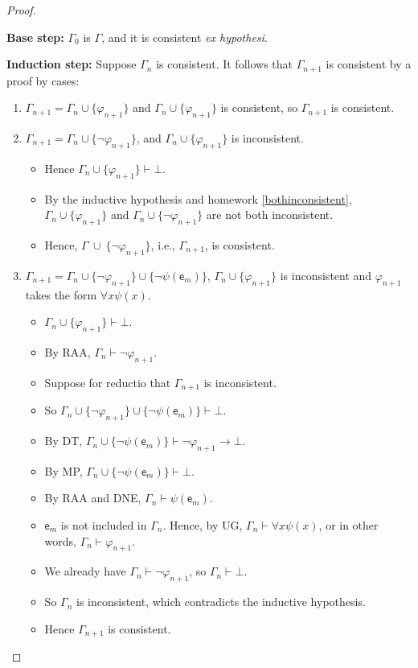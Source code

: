 \documentclass[12pt]{report}
\theoremstyle{nonumberplain}
\newtheorem{proof}{Proof}
\renewcommand{\o}[1]{\mathsf{#1}}
\begin{document}
\begin{proof}
\begin{enumerate}
\textbf{Base step:} $Γ_0$ is $Γ$, and it is consistent \textit{ex hypothesi}.

\textbf{Induction step:} Suppose $Γ_n$ is consistent. It follows that $Γ_{n+1}$ is consistent by a proof by cases:
\begin{enumerate}[label={Case~(\roman*):}]

\item $Γ_{n+1} = Γ_n ∪ \{φ_{n+1}\}$ and $Γ_n ∪ \{φ_{n+1}\}$ is consistent, so $Γ_{n+1}$ is consistent.

\item $Γ_{n+1} = Γ_n ∪ \{¬φ_{n+1}\}$, and $Γ_n ∪ \{φ_{n+1}\}$ is inconsistent.
\begin{itemize}[nolistsep,leftmargin=*]
\item Hence $Γ_n ∪ \{φ_{n+1}\} ⊢  ⊥$.

\item By the inductive hypothesis and homework \ref{bothinconsistent}, $Γ_n ∪ \{φ_{n+1}\}$ and $Γ_n ∪ \{¬φ_{n+1}\}$ are not both inconsistent.

\item Hence, $Γ\ ∪\ \{¬φ_{n+1}\}$, i.e., $Γ_{n+1}$, is consistent.

\end{itemize}

\item $Γ_{n+1} = Γ_n ∪ \{¬φ_{n+1}\} ∪ \{¬ψ (\o{e}_m)\}$,
$Γ_n ∪ \{φ_{n+1}\}$ is inconsistent and $φ_{n+1}$ takes the form $∀x ψ(x)$.
\begin{itemize}[nolistsep,leftmargin=*]
\item $Γ_n ∪ \{φ_{n+1}\} ⊢  ⊥$.
\item By RAA, $Γ_n ⊢  ¬φ_{n+1}$.
\item Suppose for reductio that $Γ_{n+1}$ is inconsistent.
\item So
 $Γ_n ∪ \{¬φ_{n+1}\} ∪ \{¬ψ(\o{e}_m)\} ⊢  ⊥$.
\item By DT, $Γ_n ∪ \{¬ψ(\o{e}_m)\} ⊢ ¬φ_{n+1} → ⊥$.
\item By MP, $Γ_n ∪ \{¬ψ(\o{e}_m)\} ⊢  ⊥$.
\item By RAA and DNE, $Γ_n ⊢  ψ (\o{e}_m)$.
\item $\o{e}_m$ is not included in $Γ_n$. Hence, by UG, $Γ_n ⊢ ∀x ψ (x)$, or in other words, $Γ_n ⊢  φ_{n+1}$.
\item We already have $Γ_n ⊢  ¬φ_{n+1}$, so $Γ_n ⊢ ⊥$.
\item So $Γ_n$ is inconsistent, which contradicts the inductive hypothesis.
\item Hence $Γ_{n+1}$ is consistent.
\end{itemize}
\end{enumerate}


\end{enumerate}
\end{proof}
\end{document}
